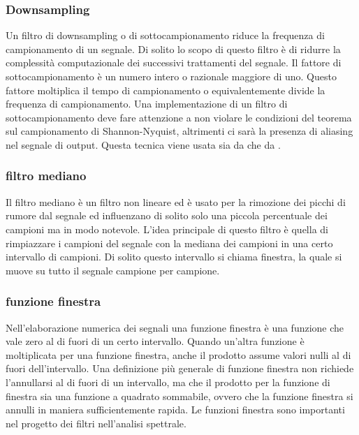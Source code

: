 \subsubsection{Downsampling }

Un filtro di downsampling o di sottocampionamento riduce la frequenza di campionamento di un segnale. Di solito lo scopo di questo filtro \`e di ridurre la complessit\`a computazionale dei successivi trattamenti del segnale. Il fattore di sottocampionamento \`e un numero intero o razionale maggiore di uno. Questo fattore moltiplica il tempo di campionamento o equivalentemente divide la frequenza di campionamento. Una implementazione di un filtro di sottocampionamento deve fare attenzione a non violare le condizioni del teorema sul campionamento di Shannon-Nyquist, altrimenti ci sar\`a la presenza di aliasing nel segnale di output. Questa tecnica viene usata sia da \cite{ASPODUOCSS} che da \cite{ASTFARA}.

\subsubsection{filtro mediano}

Il filtro mediano \`e un filtro non lineare ed \`e usato per la rimozione dei picchi di rumore dal segnale ed influenzano di solito solo una piccola percentuale dei campioni ma in modo notevole. L'idea principale di questo filtro \`e quella di rimpiazzare i campioni del segnale con la mediana dei campioni in una certo intervallo di campioni. Di solito questo intervallo si chiama finestra, la quale si muove su tutto il segnale campione per campione.



\subsubsection{funzione finestra}
Nell'elaborazione numerica dei segnali una funzione finestra \`e una funzione che vale zero al di fuori di un certo intervallo. Quando un'altra funzione \`e moltiplicata per una funzione finestra, anche il prodotto assume valori nulli al di fuori dell'intervallo. Una definizione pi\`u generale di funzione finestra non richiede l'annullarsi al di fuori di un intervallo, ma che il prodotto per la funzione di finestra sia una funzione a quadrato sommabile, ovvero che la funzione finestra si annulli in maniera sufficientemente rapida. Le funzioni finestra sono importanti nel progetto dei filtri nell'analisi spettrale. 

